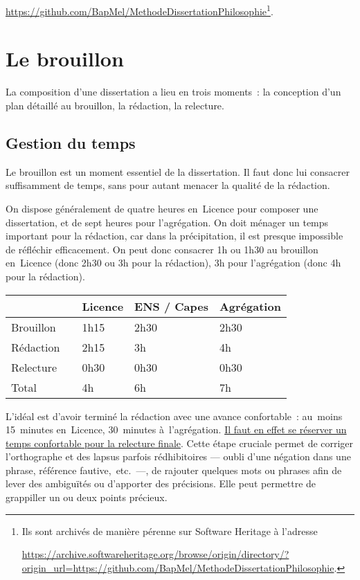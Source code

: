 \documentclass[a4paper,12pt]{report}
\begin{document}
\noindent
\url{https://github.com/BapMel/MethodeDissertationPhilosophie}\footnote{Ils sont archivés de manière pérenne sur Software Heritage à
l'adresse

\noindent
\url{https://archive.softwareheritage.org/browse/origin/directory/?origin\_url=https://github.com/BapMel/MethodeDissertationPhilosophie}.}.


\setcounter{tocdepth}{3}
\tableofcontents

\part{Le brouillon}
\label{sec:org346f0dc}
\label{org25cebf6}

La composition d'une dissertation a lieu en trois moments : la
conception d'un plan détaillé au brouillon, la rédaction, la relecture.

\chapter{Gestion du temps}
\label{sec:org309e398}

Le brouillon est un moment essentiel de la dissertation. Il faut donc
lui consacrer suffisamment de temps, sans pour autant menacer la qualité
de la rédaction.

On dispose généralement de quatre heures en Licence pour composer une
dissertation, et de sept heures pour l'agrégation. On doit ménager un
temps important pour la rédaction, car dans la précipitation, il est
presque impossible de réfléchir efficacement. On peut donc consacrer 1h
ou 1h30 au brouillon en Licence (donc 2h30 ou 3h pour la rédaction), 3h
pour l'agrégation (donc 4h pour la rédaction).

\begin{center}
\begin{tabular}{|l|l|l|l|l|}
\hline
 &  & Licence & ENS / Capes & Agrégation\\[0pt]
\hline
\hline
Brouillon &  & 1h15 & 2h30 & 2h30\\[0pt]
Rédaction &  & 2h15 & 3h & 4h\\[0pt]
Relecture &  & 0h30 & 0h30 & 0h30\\[0pt]
\hline
\hline
Total &  & 4h & 6h & 7h\\[0pt]
\hline
\end{tabular}
\end{center}

L'idéal est d'avoir terminé la rédaction avec une avance confortable :
au moins 15 minutes en Licence, 30 minutes à l'agrégation. \uline{Il faut en
effet se réserver un temps confortable pour la relecture finale}. Cette
étape cruciale permet de corriger l'orthographe et des lapsus parfois
rédhibitoires — oubli d'une négation dans une phrase, référence
fautive, etc. —, de rajouter quelques mots ou phrases afin de lever des
ambiguïtés ou d'apporter des précisions. Elle peut permettre de
grappiller un ou deux points précieux.
\end{document}
